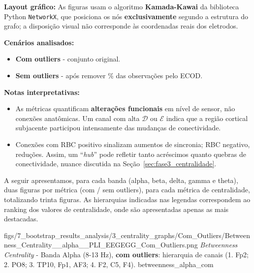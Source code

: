 \noindent\textbf{Layout gráfico:} As figuras usam o algoritmo \textbf{Kamada-Kawai} da biblioteca Python \texttt{NetworkX}, que posiciona os nós \textbf{exclusivamente} segundo a estrutura do grafo; a disposição visual não corresponde às coordenadas reais dos eletrodos.

\noindent\textbf{Cenários analisados:}
\begin{itemize}
  \item \textbf{Com outliers} - conjunto original.
  \item \textbf{Sem outliers} - após remover \% das observações pelo ECOD.
\end{itemize}

\noindent\textbf{Notas interpretativas:}
\begin{itemize}
  \item As métricas quantificam \textbf{alterações funcionais} em nível de sensor, não conexões anatômicas. Um canal com alta \(\mathcal{D}\) ou \(\mathcal{E}\) indica que a região cortical subjacente participou intensamente das mudanças de conectividade.
  \item Conexões com RBC positivo sinalizam aumentos de sincronia; RBC negativo, reduções. Assim, um ``\textit{hub}'' pode refletir tanto acréscimos quanto quebras de conectividade, nuance discutida na Seção~\ref{sec:fase3_centralidade}.
\end{itemize}

A seguir apresentamos, para cada banda (alpha, beta, delta, gamma e theta), duas figuras por métrica (com / sem outliers), para cada métrica de centralidade, totalizando trinta figuras. As hierarquias indicadas nas legendas correspondem ao ranking dos valores de centralidade, onde são apresentadas apenas as mais destacadas.

\ultrawidefigure
{figs/7_bootstrap_results_analysis/3_centrality_graphs/Com_Outliers/Betweenness_Centrality__alpha__PLI_EEGEGG_Com_Outliers.png}
{\textit{Betweenness Centrality} - Banda Alpha (8-13 Hz), \textbf{com outliers}: hierarquia de canais (1. Fp2; 2. PO8; 3. TP10, Fp1, AF3; 4. F2, C5, F4).}
{betweenness_alpha_com}

